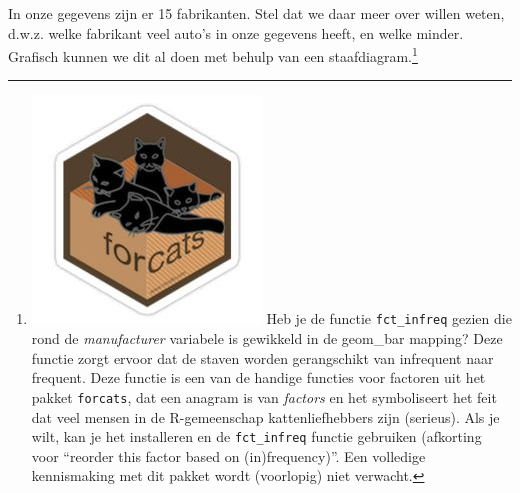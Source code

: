 \documentclass[]{tufte-book}
\newenvironment{Shaded}{}{}
\newcommand{\DataTypeTok}[1]{\textcolor[rgb]{0.56,0.13,0.00}{#1}}
\newcommand{\DecValTok}[1]{\textcolor[rgb]{0.25,0.63,0.44}{#1}}
\newcommand{\KeywordTok}[1]{\textcolor[rgb]{0.00,0.44,0.13}{\textbf{#1}}}
\newcommand{\NormalTok}[1]{#1}
\newcommand{\OperatorTok}[1]{\textcolor[rgb]{0.40,0.40,0.40}{#1}}
\newcommand{\StringTok}[1]{\textcolor[rgb]{0.25,0.44,0.63}{#1}}
\begin{document}
In onze gegevens zijn er 15 fabrikanten. Stel dat we daar meer over willen weten, d.w.z. welke fabrikant veel auto's in onze gegevens heeft, en welke minder. Grafisch kunnen we dit al doen met behulp van een staafdiagram.\footnote{\includegraphics{images/forcats.jpg} Heb je de functie \texttt{fct\_infreq} gezien die rond de \emph{manufacturer} variabele is gewikkeld in de geom\_bar mapping? Deze functie zorgt ervoor dat de staven worden gerangschikt van infrequent naar frequent. Deze functie is een van de handige functies voor factoren uit het pakket \texttt{forcats}, dat een anagram is van \emph{factors} en het symboliseert het feit dat veel mensen in de R-gemeenschap kattenliefhebbers zijn (serieus). Als je wilt, kan je het installeren en de \texttt{fct\_infreq} functie gebruiken (afkorting voor ``reorder this factor based on (in)frequency)''. Een volledige kennismaking met dit pakket wordt (voorlopig) niet verwacht.}

\begin{Shaded}
\end{Shaded}
\end{document}
